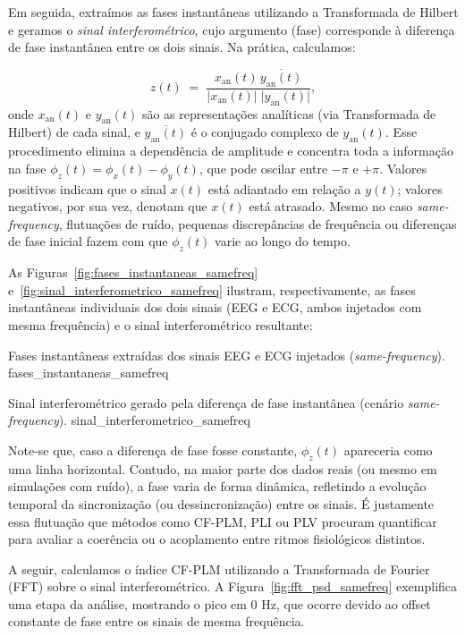\begin{itemize}
Em seguida, extraímos as fases instantâneas utilizando a Transformada de Hilbert e geramos o \textit{sinal interferométrico}, cujo argumento (fase) corresponde à diferença de fase instantânea entre os dois sinais. Na prática, calculamos:

\[
z(t) \;=\; \frac{x_{\mathrm{an}}(t)\,\overline{y_{\mathrm{an}}(t)}}{\bigl|x_{\mathrm{an}}(t)\bigr|\;\bigl|y_{\mathrm{an}}(t)\bigr|},
\]
onde \(x_{\mathrm{an}}(t)\) e \(y_{\mathrm{an}}(t)\) são as representações analíticas (via Transformada de Hilbert) de cada sinal, e \(\overline{y_{\mathrm{an}}(t)}\) é o conjugado complexo de \(y_{\mathrm{an}}(t)\). Esse procedimento elimina a dependência de amplitude e concentra toda a informação na fase \(\phi_z(t) = \phi_x(t) - \phi_y(t)\), que pode oscilar entre \(-\pi\) e \(+\pi\). Valores positivos indicam que o sinal \(x(t)\) está adiantado em relação a \(y(t)\); valores negativos, por sua vez, denotam que \(x(t)\) está atrasado. Mesmo no caso \textit{same-frequency}, flutuações de ruído, pequenas discrepâncias de frequência ou diferenças de fase inicial fazem com que \(\phi_z(t)\) varie ao longo do tempo.

As Figuras~\ref{fig:fases_instantaneas_samefreq} e~\ref{fig:sinal_interferometrico_samefreq} ilustram, respectivamente, as fases instantâneas individuais dos dois sinais (EEG e ECG, ambos injetados com mesma frequência) e o sinal interferométrico resultante:

{Fases instantâneas extraídas dos sinais EEG e ECG injetados (\textit{same-frequency}).}
{fases_instantaneas_samefreq}

{Sinal interferométrico gerado pela diferença de fase instantânea (cenário \textit{same-frequency}).}
{sinal_interferometrico_samefreq}

Note-se que, caso a diferença de fase fosse constante, \(\phi_z(t)\) apareceria como uma linha horizontal. Contudo, na maior parte dos dados reais (ou mesmo em simulações com ruído), a fase varia de forma dinâmica, refletindo a evolução temporal da sincronização (ou dessincronização) entre os sinais. É justamente essa flutuação que métodos como CF-PLM, PLI ou PLV procuram quantificar para avaliar a coerência ou o acoplamento entre ritmos fisiológicos distintos.



A seguir, calculamos o índice CF-PLM utilizando a Transformada de Fourier (FFT) sobre o sinal interferométrico. A Figura~\ref{fig:fft_psd_samefreq} exemplifica uma etapa da análise, mostrando o pico em 0 Hz, que ocorre devido ao offset constante de fase entre os sinais de mesma frequência.


\end{itemize}
